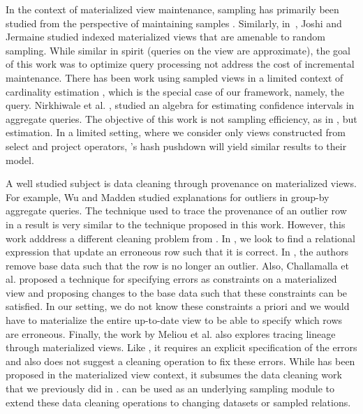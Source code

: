 In the context of materialized view maintenance, sampling has primarily been studied from the perspective of maintaining samples \cite{DBLP:conf/icde/OlkenR92}.
Similarly, in~\cite{joshi2008materialized}, Joshi and Jermaine studied indexed materialized views that are amenable to random sampling.
While similar in spirit (queries on the view are approximate), the goal of this work was to optimize query processing not address the cost of incremental maintenance.
There has been work using sampled views in a limited context of cardinality estimation \cite{larson2007cardinality}, which is the special case of our framework, namely, the \countfunc query.
Nirkhiwale et al. \cite{DBLP:journals/pvldb/NirkhiwaleDJ13}, studied an algebra for estimating confidence intervals in aggregate queries.
The objective of this work is not sampling efficiency, as in \svc, but estimation.
In a limited setting, where we consider only views constructed from select and project operators, \svc's hash pushdown will yield similar results to their model.

A well studied subject is data cleaning through provenance on materialized views.
For example, Wu and Madden \cite{DBLP:journals/pvldb/0002M13} studied explanations for outliers in group-by aggregate queries.
The technique used to trace the provenance of an outlier row in a result is very similar to the technique proposed in this work.
However, this work adddress a different cleaning problem from \svc.
In \svc, we look to find a relational expression that update an erroneous row such that it is correct.
In \cite{DBLP:journals/pvldb/0002M13}, the authors remove base data such that the row is no longer an outlier.
Also, Challamalla et al. \cite{DBLP:conf/sigmod/ChalamallaIOP14} proposed a technique for specifying errors as constraints on a materialized view and proposing changes to the base data such that these constraints can be satisfied.
In our setting, we do not know these constraints a priori and we would have to materialize the entire up-to-date view to be able to specify which rows are erroneous.
Finally, the work by Meliou et al. \cite{DBLP:conf/sigmod/MeliouGNS11} also explores tracing lineage through materialized views. 
Like \cite{DBLP:journals/pvldb/0002M13, DBLP:journals/pvldb/0002M13}, it requires an explicit specification of the errors and also does not suggest a cleaning operation to fix these errors.
While \svc has been proposed in the materialized view context, it subsumes the data cleaning work that we previously did in \cite{wang1999sample}.
\svc can be used as an underlying sampling module to extend these data cleaning operations to changing datasets or sampled relations.

